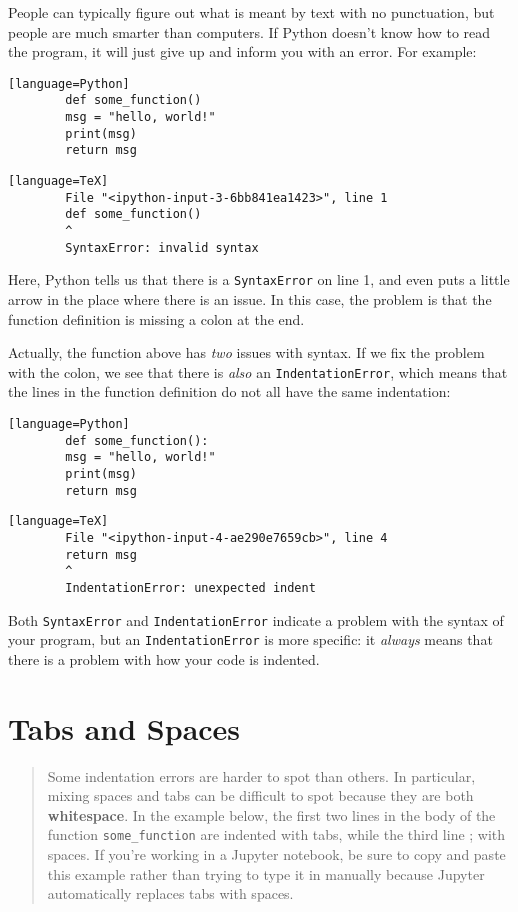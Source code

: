 \documentclass{article}
\begin{document}
	People can typically figure out what is meant by text with no punctuation, but people are much smarter than computers. If Python doesn't know how to read the program, it will just give up and inform you with an error. For example:
	
	\begin{verbatim}[language=Python]
		def some_function()
		msg = "hello, world!"
		print(msg)
		return msg
	\end{verbatim}
	
	\begin{verbatim}[language=TeX]
		File "<ipython-input-3-6bb841ea1423>", line 1
		def some_function()
		^
		SyntaxError: invalid syntax
	\end{verbatim}
	
	Here, Python tells us that there is a \texttt{SyntaxError} on line 1, and even puts a little arrow in the place where there is an issue. In this case, the problem is that the function definition is missing a colon at the end.
	
	Actually, the function above has \textit{two} issues with syntax. If we fix the problem with the colon, we see that there is \textit{also} an \texttt{IndentationError}, which means that the lines in the function definition do not all have the same indentation:
	
	\begin{verbatim}[language=Python]
		def some_function():
		msg = "hello, world!"
		print(msg)
		return msg
	\end{verbatim}
	
	\begin{verbatim}[language=TeX]
		File "<ipython-input-4-ae290e7659cb>", line 4
		return msg
		^
		IndentationError: unexpected indent
	\end{verbatim}
	
	Both \texttt{SyntaxError} and \texttt{IndentationError} indicate a problem with the syntax of your program, but an \texttt{IndentationError} is more specific: it \textit{always} means that there is a problem with how your code is indented.
	
	\section{Tabs and Spaces}
	
	\begin{quote}
		Some indentation errors are harder to spot than others. In particular, mixing spaces and tabs can be difficult to spot because they are both \textbf{whitespace}. In the example below, the first two lines in the body of the function \texttt{some\_function} are indented with tabs, while the third line ; with spaces. If you're working in a Jupyter notebook, be sure to copy and paste this example rather than trying to type it in manually because Jupyter automatically replaces tabs with spaces.
	\end{quote}
	
\end{document}

